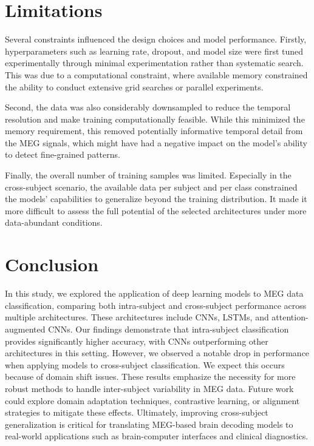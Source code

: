 \documentclass[conference]{IEEEtran}
\begin{document}
\section{Limitations}
Several constraints influenced the design choices and model performance. Firstly, hyperparameters such as learning rate, dropout, and model size were first tuned experimentally through minimal experimentation rather than systematic search. This was due to a computational constraint, where available memory constrained the ability to conduct extensive grid searches or parallel experiments.

Second, the data was also considerably downsampled to reduce the temporal resolution and make training computationally feasible. While this minimized the memory requirement, this removed potentially informative temporal detail from the MEG signals, which might have had a negative impact on the model's ability to detect fine-grained patterns.

Finally, the overall number of training samples was limited. Especially in the cross-subject scenario, the available data per subject and per class constrained the models' capabilities to generalize beyond the training distribution. It made it more difficult to assess the full potential of the selected architectures under more data-abundant conditions.

\section{Conclusion}
In this study, we explored the application of deep learning models to MEG data classification, comparing both intra-subject and cross-subject performance across multiple architectures. These architectures include CNNs, LSTMs, and attention-augmented CNNs. Our findings demonstrate that intra-subject classification provides significantly higher accuracy, with CNNs outperforming other architectures in this setting. However, we observed a notable drop in performance when applying models to cross-subject classification. We expect this occurs because of domain shift issues. These results emphasize the necessity for more robust methods to handle inter-subject variability in MEG data. Future work could explore domain adaptation techniques, contrastive learning, or alignment strategies to mitigate these effects. Ultimately, improving cross-subject generalization is critical for translating MEG-based brain decoding models to real-world applications such as brain-computer interfaces and clinical diagnostics.
\end{document}
